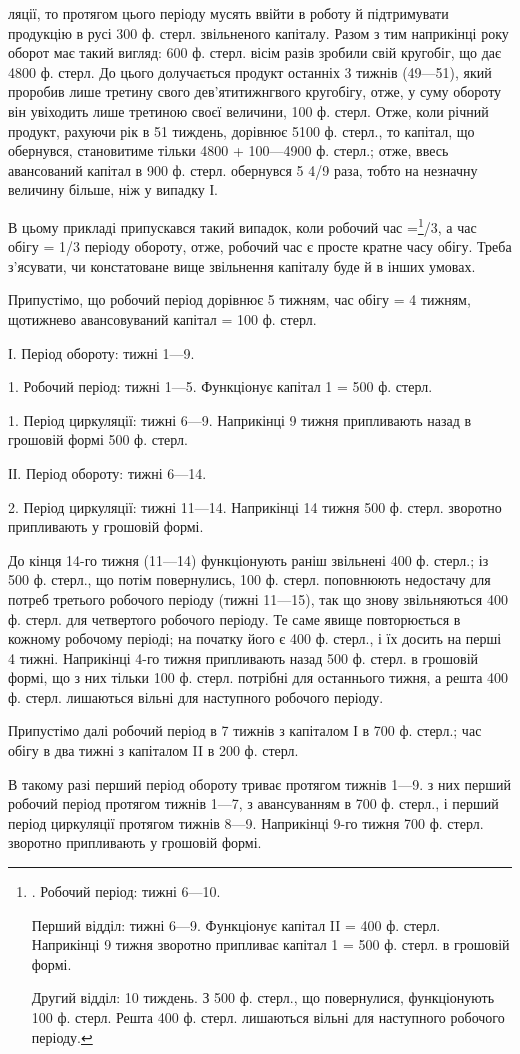 ляції, то протягом цього періоду мусять ввійти в роботу й підтримувати
продукцію в русі 300 ф. стерл. звільненого капіталу. Разом з тим наприкінці
року оборот має такий вигляд: 600 ф. стерл. вісім разів зробили
свій кругобіг, що дає 4800 ф. стерл. До цього долучається продукт
останніх 3 тижнів (49—51), який проробив лише третину свого дев’ятитижнгвого
кругобігу, отже, у суму обороту він увіходить лише третиною
своєї величини, 100 ф. стерл. Отже, коли річний продукт, рахуючи рік в
51 тиждень, дорівнює 5100 ф. стерл., то капітал, що обернувся, становитиме
тільки 4800 + 100—4900 ф. стерл.; отже, ввесь авансований капітал
в 900 ф. стерл. обернувся 5 4/9 раза, тобто на незначну величину більше,
ніж у випадку І.

В цьому прикладі припускався такий випадок, коли робочий час =\footnote{
. Робочий період: тижні 6—10.

Перший відділ: тижні 6—9. Функціонує капітал II = 400 ф. стерл.
Наприкінці 9 тижня зворотно припливає капітал 1 = 500 ф. стерл. в грошовій
формі.

Другий відділ: 10 тиждень. З 500 ф. стерл., що повернулися, функціонують
100 ф. стерл. Решта 400 ф. стерл. лишаються вільні для наступного
робочого періоду.
}/3,
а час обігу = 1/3 періоду обороту, отже, робочий час є просте кратне
часу обігу. Треба з’ясувати, чи констатоване вище звільнення капіталу
буде й в інших умовах.

Припустімо, що робочий період дорівнює 5 тижням, час обігу = 4 тижням,
щотижнево авансовуваний капітал = 100 ф. стерл.

І. Період обороту: тижні 1—9.

1. Робочий період: тижні 1—5. Функціонує капітал 1 = 500 ф. стерл.

1. Період циркуляції: тижні 6—9. Наприкінці 9 тижня припливають
назад в грошовій формі 500 ф. стерл.

ІІ. Період обороту: тижні 6—14.

2. Період циркуляції: тижні 11—14. Наприкінці 14 тижня 500 ф.
стерл. зворотно припливають у грошовій формі.

До кінця 14-го тижня (11—14) функціонують раніш звільнені 400 ф.
стерл.; із 500 ф. стерл., що потім повернулись, 100 ф. стерл. поповнюють
недостачу для потреб третього робочого періоду (тижні 11—15),
так що знову звільняються 400 ф. стерл. для четвертого робочого періоду.
Те саме явище повторюється в кожному робочому періоді; на
початку його є 400 ф. стерл., і їх досить на перші 4 тижні. Наприкінці
4-го тижня припливають назад 500 ф. стерл. в грошовій формі, що з
них тільки 100 ф. стерл. потрібні для останнього тижня, а решта 400 ф.
стерл. лишаються вільні для наступного робочого періоду.

Припустімо далі робочий період в 7 тижнів з капіталом І в 700 ф.
стерл.; час обігу в два тижні з капіталом II в 200 ф. стерл.

В такому разі перший період обороту триває протягом тижнів 1—9.
з них перший робочий період протягом тижнів 1—7, з авансуванням
в 700 ф. стерл., і перший період циркуляції протягом тижнів 8—9. Наприкінці
9-го тижня 700 ф. стерл. зворотно припливають у грошовій формі.
